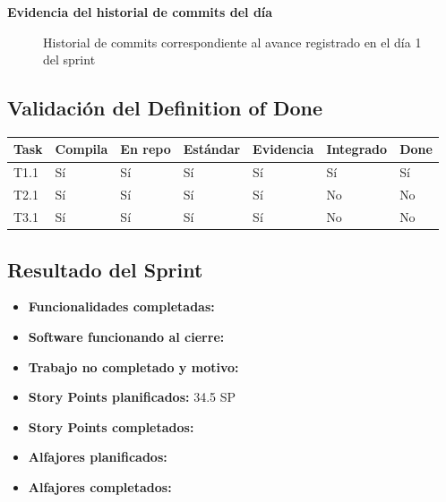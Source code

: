 \documentclass[12pt,a4paper]{article}
\begin{document}
\textbf{Evidencia del historial de commits del día}

\begin{figure}[H]
    \centering
    \caption{Historial de commits correspondiente al avance registrado en el día 1 del sprint}
\end{figure}


\subsection{Validación del Definition of Done}

\begin{longtable}{|p{1.5cm}|p{1.5cm}|p{2.5cm}|p{2cm}|p{2cm}|p{2cm}|p{1.5cm}|}
\hline
\textbf{Task} & \textbf{Compila} & \textbf{En repo} & \textbf{Estándar} & \textbf{Evidencia} & \textbf{Integrado} & \textbf{Done} \\
\hline
T1.1 & Sí & Sí & Sí & Sí & Sí & Sí \\
\hline
T2.1 & Sí & Sí & Sí & Sí & No & No \\
\hline
T3.1 & Sí & Sí & Sí & Sí & No & No \\
\hline
\end{longtable}
\subsection{Resultado del Sprint}

\begin{itemize}
    \item \textbf{Funcionalidades completadas:} %
    \item \textbf{Software funcionando al cierre:} %
    \item \textbf{Trabajo no completado y motivo:} %
    \item \textbf{Story Points planificados:} 34.5 SP
    \item \textbf{Story Points completados:} %
    \item \textbf{Alfajores planificados:} %
    \item \textbf{Alfajores completados:} %
\end{itemize}
\end{document}
